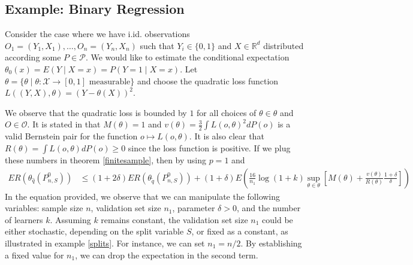 \documentclass[11pt, a4paper]{article}
\theoremstyle{definition}
\theoremstyle{remark}
\newcommand{\q}{q}
\newcommand{\btheta}{\theta}
\begin{document}
\subsection{Example: Binary Regression}
Consider the case where we have i.id. observations $ O_1 = (Y_1 , X_1) , \dots , O_n = (Y_n , X_n) $ such that $ Y_i \in \{0, 1\} $ and $ X \in \mathbb{R}^{d} $ distributed according some $ P \in \mathcal{P} $. We would like to estimate the conditional expectation $ \btheta_0(x) = E(Y \mid X = x) = P(Y = 1 \mid X = x) $.  Let $ \btheta = \{\btheta \mid \btheta : \mathcal{X} \to [0,1] \text{ measurable} \}  $ and choose the quadratic loss function $ L((Y, X), \btheta) = (Y - \btheta(X))^2 $.


We observe that the quadratic loss is bounded by $ 1 $ for all choices of $ \btheta \in \btheta $ and $ O \in \mathcal{O} $. It is stated in \cite[7]{vaart06} that $ M(\btheta) = 1 $ and $ v(\btheta) = \frac{3}{2} \int L(o, \btheta)^2 dP(o)  $ is a valid Bernstein pair for the function $ o \mapsto L(o, \btheta)$. It is also clear that $ R(\btheta) = \int L(o , \btheta) d P(o) \geq 0  $ since the loss function is positive. If we plug these numbers in theorem \ref{finitesample}, then by using $ p = 1 $ and 
\begin{align*}
   ER(\btheta_{\hat{\q}}(P_{n, S}^{0})) &\leq(1 + 2 \delta) ER(\btheta_{ \tilde{\q}}(P_{n,S}^{0})) +(1 + \delta) E \left(  \frac{16}{n_1} \log (1 +k) \sup_{\btheta \in \btheta} \left[ M(\btheta) + \frac{v(\btheta)}{R(\btheta)} \frac{1 + \delta}{\delta}\right]\right)
\end{align*}
In the equation provided, we observe that we can manipulate the following variables: sample size $n$, validation set size $n_1$, parameter $\delta > 0$, and the number of learners $k$. Assuming $k$ remains constant, the validation set size $n_1$ could be either stochastic, depending on the split variable $S$, or fixed as a constant, as illustrated in example \ref{splits}. For instance, we can set $n_1 = n/2$. By establishing a fixed value for $n_1$, we can drop the expectation in the second term. 
\end{document}
